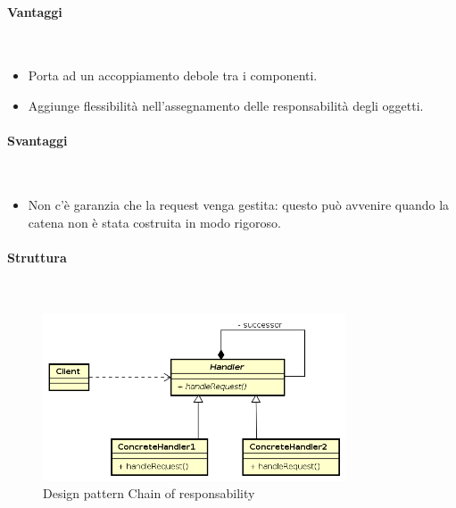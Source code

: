 \paragraph{Vantaggi} \mbox{} \\
\begin{itemize}
\item Porta ad un accoppiamento debole tra i componenti.
\item Aggiunge flessibilità nell’assegnamento delle responsabilità degli oggetti.
\end{itemize}
\paragraph{Svantaggi} \mbox{} \\
\begin{itemize}
\item Non c’è garanzia che la request venga gestita: questo può avvenire quando la catena non è stata costruita in modo rigoroso.
\end{itemize}
\paragraph{Struttura} \mbox{} \\
\begin{figure}[H]
\centering
\includegraphics[width=0.8\textwidth]{res/sections/backend/chainOfResponsability.png}
\caption{Design pattern Chain of responsability}
\end{figure}
